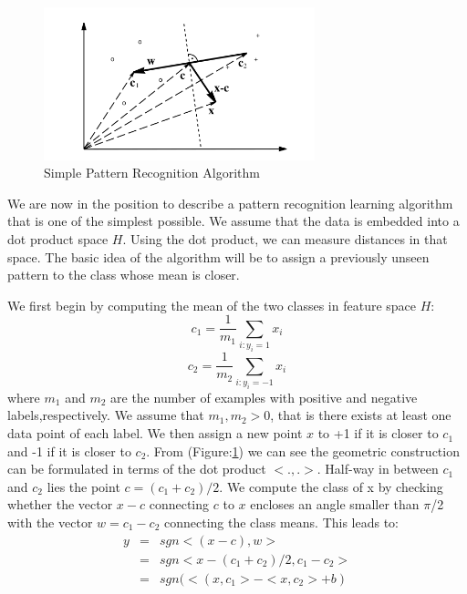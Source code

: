 \documentclass{article}
\begin{document}
\begin{figure}
  \centering
  \includegraphics[width=0.7\textwidth]{simple_pattern.png}
  \caption{Simple Pattern Recognition Algorithm}
  \label{fig:fig1}
\end{figure}
We are now in the position to describe a pattern recognition learning algorithm that is one of the simplest possible. We assume that the data is embedded into a dot product space $H$. Using the dot product, we can measure distances in that space. The basic idea of the algorithm will be to assign a previously unseen pattern to the class whose mean is closer.

We first begin by computing the mean of the two classes in feature space $H$:
\begin{equation}
\label{mean1}
    c_1 = \frac{1}{m_1}\sum_{i:y_i = 1}{x_i}
\end{equation}
\begin{equation}
\label{mean2}
    c_2 = \frac{1}{m_2}\sum_{i:y_i = -1}{x_i}
\end{equation}
where $m_1$ and $m_2$ are the number of examples with positive and negative labels,respectively. We assume that $m_1 , m_2 > 0$, that is there exists at least one data point of each label. We then assign a new point $x$ to +1 if it is closer to $c_1$ and -1 if it is closer to $c_2$. From (Figure:\ref{fig:fig1}) we can see the geometric construction can be formulated in terms of the dot product $<. ,.>$. Half-way in between $c_1$ and $c_2$ lies the point $c = (c_1 + c_2 )/2$. We compute the class of x by checking whether the vector $x - c$ connecting $c$ to $x$ encloses an angle smaller than $\pi$/2 with the vector $w = c_1 - c_2$ connecting the class means. This leads to:
\begin{eqnarray}
\label{simple_2}
y & = & sgn <(x-c),w> \nonumber \\
&=& sgn <x-(c_1+c_2)/2,c_1-c_2> \nonumber \\
& = & sgn (<(x,c_1>-<x,c_2> +b)
\end{eqnarray}
\end{document}
